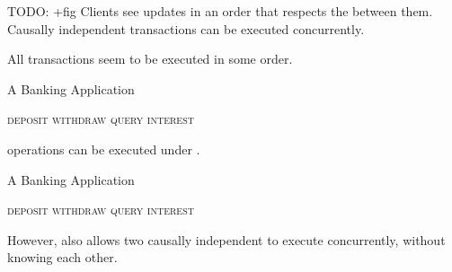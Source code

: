 \begin{frame}{\cc}
  \begin{center}
    TODO: +fig
    Clients see updates in an order that respects the  between them. \\[3pt]
    Causally independent transactions can be executed concurrently.
  \end{center}
\end{frame}

\begin{frame}{\ser}
  \begin{center}
    All transactions seem to be executed in some  order.
  \end{center}
\end{frame}

\begin{frame}{A Banking Application}
  \begin{center}
    \textsc{deposit \quad withdraw \quad query \quad interest}

    \pause
    \vspace{0.50cm}
     operations can be executed under \causalcolor{\cc}.

    \pause
    \vspace{0.50cm}
    {}
  \end{center}
\end{frame}

\begin{frame}{A Banking Application}
  \begin{center}
    \textsc{deposit \quad withdraw \quad query \quad interest}

    \pause
    \vspace{0.50cm}
    {However, \cc{} also allows two causally independent  to execute concurrently,
      without knowing each other.}

    \pause
    \vspace{0.50cm}
    {}
  \end{center}
\end{frame}

